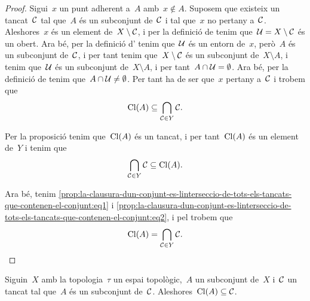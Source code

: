 \documentclass[../topologia.tex]{subfiles}
\begin{document}
    \begin{proof}
        Sigui~\(x\) un punt adherent a~\(A\) amb~\(x\notin A\).
        Suposem que existeix un tancat~\(\mathcal{C}\) tal que~\(A\) és un subconjunt de~\(\mathcal{C}\) i tal que~\(x\) no pertany a~\(\mathcal{C}\).
        Aleshores~\(x\) és un element de~\(X\setminus\mathcal{C}\), i per la definició de  tenim que~\(\mathcal{U}=X\setminus\mathcal{C}\) és un obert.
        Ara bé, per la definició d' tenim que~\(\mathcal{U}\) és un entorn de~\(x\), però~\(A\) és un subconjunt de~\(\mathcal{C}\), i per tant tenim que~\(X\setminus\mathcal{C}\) és un subconjunt de~\(X\setminus A\), i tenim que~\(\mathcal{U}\) és un subconjunt de~\(X\setminus A\), i per tant~\(A\cap\mathcal{U}=\emptyset\).
        Ara bé, per la definició de  tenim que~\(A\cap\mathcal{U}\neq\emptyset\).
        Per tant ha de ser que~\(x\) pertany a~\(\mathcal{C}\) i trobem que
        \begin{equation}
            \label{prop:la-clausura-dun-conjunt-es-linterseccio-de-tots-els-tancats-que-contenen-el-conjunt:eq1}
            \operatorname{Cl}(A)\subseteq\bigcap_{\mathcal{C}\in Y}\mathcal{C}.
        \end{equation}

        Per la proposició  tenim que~\(\operatorname{Cl}(A)\) és un tancat, i per tant~\(\operatorname{Cl}(A)\) és un element de~\(Y\) i tenim que
        \begin{equation}
            \label{prop:la-clausura-dun-conjunt-es-linterseccio-de-tots-els-tancats-que-contenen-el-conjunt:eq2}
            \bigcap_{\mathcal{C}\in Y}\mathcal{C}\subseteq\operatorname{Cl}(A).
        \end{equation}

        Ara bé, tenim \eqref{prop:la-clausura-dun-conjunt-es-linterseccio-de-tots-els-tancats-que-contenen-el-conjunt:eq1} i \eqref{prop:la-clausura-dun-conjunt-es-linterseccio-de-tots-els-tancats-que-contenen-el-conjunt:eq2}, i pel  trobem que
        \[
            \operatorname{Cl}(A)=\bigcap_{\mathcal{C}\in Y}\mathcal{C}.\qedhere
        \]
    \end{proof}
    \begin{corollary}
        \label{cor:la-clausura-dun-conjunt-es-el-tancat-mes-petit-que-el-conte}
        Siguin~\(X\) amb la topologia~\(\tau\) un espai topològic,~\(A\) un subconjunt de~\(X\) i~\(\mathcal{C}\) un tancat tal que~\(A\) és un subconjunt de~\(\mathcal{C}\).
        Aleshores~\(\operatorname{Cl}(A)\subseteq\mathcal{C}\).
    \end{corollary}
\end{document}
